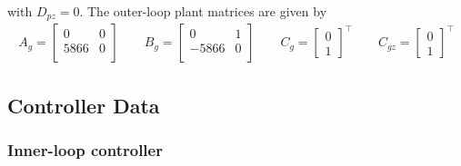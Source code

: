 with $D_{pz}=0$.
The outer-loop plant matrices are given by
\begin{equation*}
  \begin{gathered}
    A_{g} =
    \begin{bmatrix}
      0 & 0 \\
      5866 & 0 \\
    \end{bmatrix}
    \qquad
    B_{g} =
    \begin{bmatrix}
      0 & 1 \\
      -5866 & 0 \\
    \end{bmatrix}
    \qquad
    C_{g}=
    \begin{bmatrix}
      0 \\
      1
    \end{bmatrix}^{\top}
    \qquad
    C_{gz}=
    \begin{bmatrix}
      0 \\
      1
    \end{bmatrix}^{\top}
  \end{gathered}
\end{equation*}

\subsection{Controller Data}

\subsubsection{Inner-loop controller}

